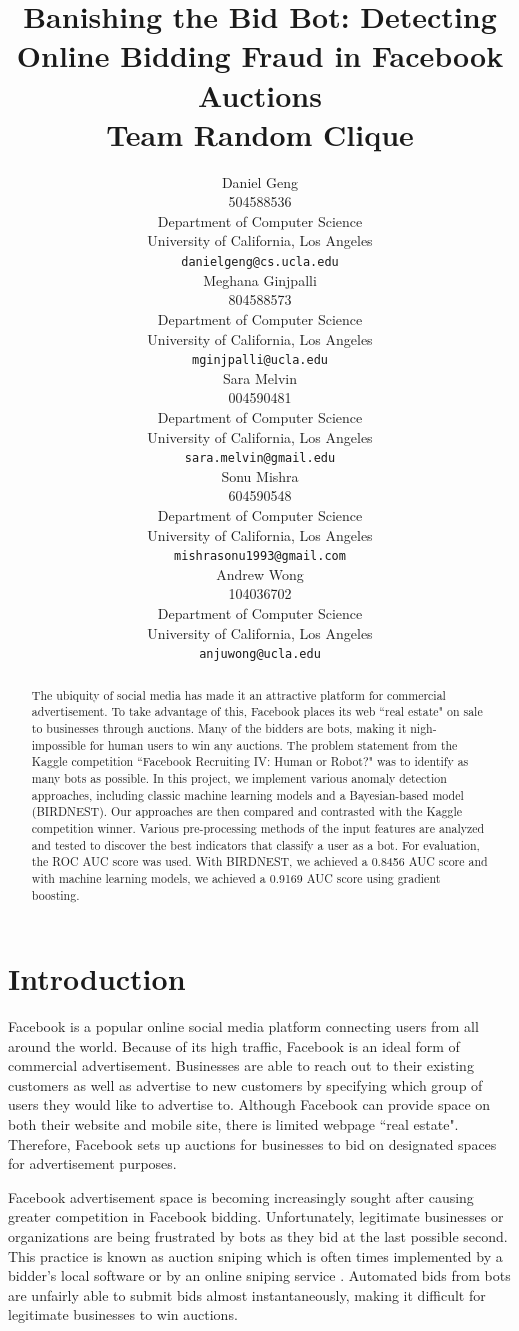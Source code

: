 \documentclass{article} %
\title{Banishing the Bid Bot: Detecting Online Bidding Fraud in Facebook Auctions \\ \large Team Random Clique}
\author{
Daniel Geng \\
504588536 \\
Department of Computer Science\\
University of California, Los Angeles\\
\texttt{danielgeng@cs.ucla.edu} \\
\And
Meghana Ginjpalli \\
804588573 \\
Department of Computer Science \\
University of California, Los Angeles\\
\texttt{mginjpalli@ucla.edu} \\
\AND
Sara Melvin \\
004590481 \\
Department of Computer Science \\
University of California, Los Angeles\\
\texttt{sara.melvin@gmail.edu} \\
\And
Sonu Mishra \\
604590548 \\
Department of Computer Science\\
University of California, Los Angeles\\
\texttt{mishrasonu1993@gmail.com} \\
\And
Andrew Wong \\
104036702 \\
Department of Computer Science\\
University of California, Los Angeles\\
\texttt{anjuwong@ucla.edu} \\
}
\begin{document}
\maketitle

\begin{abstract}

The ubiquity of social media has made it an attractive platform for commercial advertisement.
To take advantage of this, Facebook places its web ``real estate" on sale to businesses through auctions.
Many of the bidders are bots, making it nigh-impossible for human users to win any auctions.
The problem statement from the Kaggle competition ``Facebook Recruiting IV: Human or Robot?" was to identify as many bots as possible.
In this project, we implement various anomaly detection approaches, including classic machine learning models and a Bayesian-based model (BIRDNEST).
Our approaches are then compared and contrasted with the Kaggle competition winner.
Various pre-processing methods of the input features are analyzed and tested to discover the best indicators that classify a user as a bot.
For evaluation, the ROC AUC score was used.
With BIRDNEST, we achieved a 0.8456 AUC score and with machine learning models, we achieved a 0.9169 AUC score using gradient boosting.

\end{abstract}

\section{Introduction}

Facebook is a popular online social media platform connecting users from all around the world.
Because of its high traffic, Facebook is an ideal form of commercial advertisement.
Businesses are able to reach out to their existing customers as well as advertise to new customers by specifying which group of users they would like to advertise to.
Although Facebook can provide space on both their website and mobile site, there is limited webpage ``real estate".
Therefore, Facebook sets up auctions for businesses to bid on designated spaces for advertisement purposes.

Facebook advertisement space is becoming increasingly sought after causing greater competition in Facebook bidding.
Unfortunately, legitimate businesses or organizations are being frustrated by bots as they bid at the last possible second. This practice is known as auction sniping which is often times implemented by a bidder's local software or by an online sniping service \cite{auction}.
Automated bids from bots are unfairly able to submit bids almost instantaneously, making it difficult for legitimate businesses to win auctions.
\end{document}
